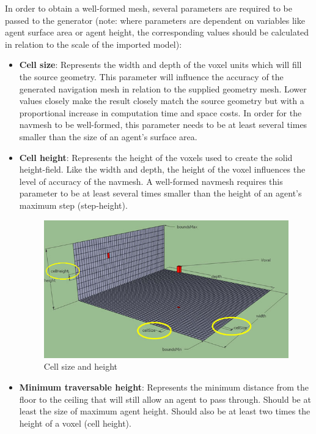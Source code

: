 In order to obtain a well-formed mesh, several parameters are required to be passed to the generator (note: where parameters are dependent on variables like agent surface area or agent height, the corresponding values should be calculated in relation to the scale of the imported model):
\begin{itemize}
  \item\textbf{Cell size}: Represents the width and depth of the voxel units which will fill the source geometry. This parameter will influence the accuracy of the generated navigation mesh in relation to the supplied geometry mesh. Lower values closely make the result closely match the source geometry but with a proportional increase in computation time and space costs. In order for the navmesh to be well-formed, this parameter needs to be at least several times smaller than the size of an agent's surface area.
  
  \item\textbf{Cell height}: Represents the height of the voxels used to create the solid height-field. Like the width and depth, the height of the voxel influences the level of accuracy of the navmesh. A well-formed navmesh requires this parameter to be at least several times smaller than the height of an agent's maximum step (step-height).
  
\begin{figure}[H]
	\centering
	\includegraphics[width=1\textwidth]{../images/cell_size_height.png}
	\caption{Cell size and height}
\end{figure}   

  
  \item\textbf{Minimum traversable height}: Represents the minimum distance from the floor to the ceiling that will still allow an agent to pass through. Should be at least the size of maximum agent height. Should also be at least two times the height of a voxel (cell height).
  

\end{itemize}
